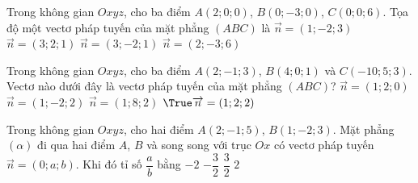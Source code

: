 \begin{ex}%
	Trong không gian $Oxyz$, cho ba điểm $A(2;0;0)$, $B(0;-3;0)$, $C(0;0;6)$. Tọa độ một vectơ pháp tuyến của mặt phẳng $(ABC)$ là
	\choice
	{$\overrightarrow{n}=(1;-2;3)$}
	{$\overrightarrow{n}=(3;2;1)$}
	{\True $\overrightarrow{n}=(3;-2;1)$}
	{$\overrightarrow{n}=(2;-3;6)$}
\end{ex}

\begin{ex}
	Trong không gian $Oxyz$, cho ba điểm $A(2;-1;3)$, $B(4;0;1)$ và $C(-10;5;3)$. Vectơ nào dưới đây là vectơ pháp tuyến của mặt phẳng $(ABC)$?
	\choice
	{$\overrightarrow{n}=(1;2;0)$}
	{$\overrightarrow{n}=(1;-2;2)$}
	{$\overrightarrow{n}=(1;8;2)$}
	{$\True \overrightarrow{n}=(1;2;2)$}
\end{ex}


\begin{ex}%
	Trong không gian $Oxyz$, cho hai điểm $A(2;-1;5)$, $B(1;-2;3)$. Mặt phẳng $(\alpha)$ đi qua hai điểm $A$, $B$ và song song với trục $Ox$ có vectơ pháp tuyến $\overrightarrow{n}=(0;a;b)$. Khi đó tỉ số $\dfrac{a}{b}$ bằng
	\choice
	{\True $-2$}
	{$-\dfrac{3}{2}$}
	{$\dfrac{3}{2}$}
	{$2$}
\end{ex}

